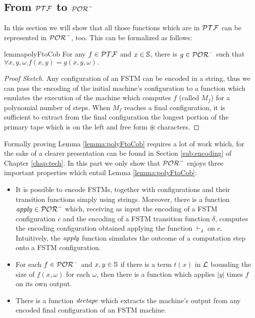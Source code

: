 \subsection{From $\mathcal{PTF}$ to $\mathcal{POR}^-$}\label{sec:G}

In this section we will show that all those functions which are in $\mathcal{PTF}$
can be represented in $\mathcal{POR}^-$, too. This can be formalized as follows:

\begin{restatable}{lemma}{polyFtoCob}
\label{lemma:polyFtoCob}
  For any $f\in \mathcal{PTF}$ and $x\in \mathbb{S}$,
  there is $g\in \mathcal{POR}^-$
  such that
  $
  \forall x, y, \omega. f(x, y)=g(x, y,\omega).
  $
\end{restatable}

\begin{proof}[Proof Sketch]
  Any configuration of an FSTM
  can be encoded in a string, thus we
  can pass the encoding of the initial machine's configuration
  to a function which emulates the execution of the machine which computes $f$
  (called $M_f$) for
  a polynomial number of steps.
  When $M_f$ reaches a final configuration, it is sufficient to extract
  from the final configuration the longest portion of the primary tape
  which is on the left and free form $\circledast$ characters.
\end{proof}

Formally proving Lemma \ref{lemma:polyFtoCob} requires a lot of work which, for the sake of a clearer presentation can be found in
 Section \ref{sub:encoding} of Chapter \ref{chap:tech}. In this part
we only show that
$\mathcal{POR}^-$ enjoys three important properties which entail Lemma \ref{lemma:polyFtoCob}:

\begin{itemize}
  \item It is possible to encode FSTMs, together with configurations
  and their transition functions simply using strings. Moreover,
  there is a function $\mathit{apply} \in \mathcal{POR}^-$ which, receiving as input
  the encoding of a FSTM configuration $c$ and the encoding of a
  FSTM transition function $\delta$, computes the encoding
  configuration obtained applying the function $\vdash_\delta$
  on $c$. Intuitively, the $\mathit{apply}$ function simulates the outcome
  of a computation step onto a FSTM configuration.
  \item For each $f \in \mathcal{POR}^-$ and $x, y \in \mathbb{S}$ if there is a
  term $t(x)$ in $\mathcal{L}$
  bounding the size of $f(x, \omega)$ for each $\omega$, then there is a function which
  applies $|y|$ times $f$ on its own output.
  \item There is a function $\mathit{dectape}$ which extracts
  the machine's output from any encoded final configuration of an FSTM machine.
\end{itemize}

